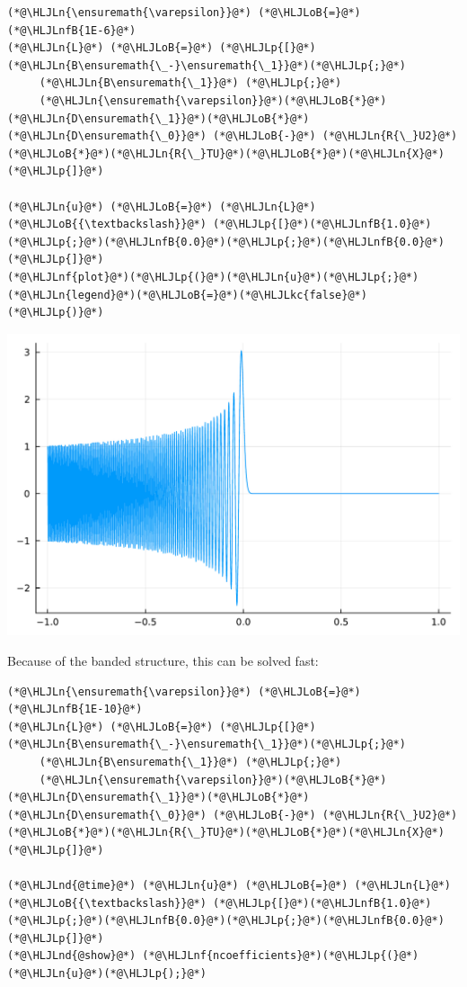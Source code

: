 \documentclass[12pt,a4paper]{article}
\newcommand{\HLJLkc}[1]{\textcolor[RGB]{59,151,46}{\textit{#1}}}
\newcommand{\HLJLn}[1]{#1}
\newcommand{\HLJLnd}[1]{\textcolor[RGB]{214,102,97}{#1}}
\newcommand{\HLJLnf}[1]{\textcolor[RGB]{66,102,213}{#1}}
\newcommand{\HLJLnfB}[1]{\textcolor[RGB]{59,151,46}{#1}}
\newcommand{\HLJLoB}[1]{\textcolor[RGB]{102,102,102}{\textbf{#1}}}
\newcommand{\HLJLp}[1]{#1}
\begin{document}
\begin{lstlisting}
(*@\HLJLn{\ensuremath{\varepsilon}}@*) (*@\HLJLoB{=}@*) (*@\HLJLnfB{1E-6}@*)
(*@\HLJLn{L}@*) (*@\HLJLoB{=}@*) (*@\HLJLp{[}@*)(*@\HLJLn{B\ensuremath{\_-}\ensuremath{\_1}}@*)(*@\HLJLp{;}@*)
     (*@\HLJLn{B\ensuremath{\_1}}@*) (*@\HLJLp{;}@*)
     (*@\HLJLn{\ensuremath{\varepsilon}}@*)(*@\HLJLoB{*}@*)(*@\HLJLn{D\ensuremath{\_1}}@*)(*@\HLJLoB{*}@*)(*@\HLJLn{D\ensuremath{\_0}}@*) (*@\HLJLoB{-}@*) (*@\HLJLn{R{\_}U2}@*)(*@\HLJLoB{*}@*)(*@\HLJLn{R{\_}TU}@*)(*@\HLJLoB{*}@*)(*@\HLJLn{X}@*)(*@\HLJLp{]}@*)

(*@\HLJLn{u}@*) (*@\HLJLoB{=}@*) (*@\HLJLn{L}@*) (*@\HLJLoB{{\textbackslash}}@*) (*@\HLJLp{[}@*)(*@\HLJLnfB{1.0}@*)(*@\HLJLp{;}@*)(*@\HLJLnfB{0.0}@*)(*@\HLJLp{;}@*)(*@\HLJLnfB{0.0}@*)(*@\HLJLp{]}@*)
(*@\HLJLnf{plot}@*)(*@\HLJLp{(}@*)(*@\HLJLn{u}@*)(*@\HLJLp{;}@*) (*@\HLJLn{legend}@*)(*@\HLJLoB{=}@*)(*@\HLJLkc{false}@*)(*@\HLJLp{)}@*)
\end{lstlisting}

\includegraphics[width=\linewidth]{jl_hpkPoK/OP_methods_test_44_1.pdf}

Because of the banded structure, this can be solved fast:


\begin{lstlisting}
(*@\HLJLn{\ensuremath{\varepsilon}}@*) (*@\HLJLoB{=}@*) (*@\HLJLnfB{1E-10}@*)
(*@\HLJLn{L}@*) (*@\HLJLoB{=}@*) (*@\HLJLp{[}@*)(*@\HLJLn{B\ensuremath{\_-}\ensuremath{\_1}}@*)(*@\HLJLp{;}@*)
     (*@\HLJLn{B\ensuremath{\_1}}@*) (*@\HLJLp{;}@*)
     (*@\HLJLn{\ensuremath{\varepsilon}}@*)(*@\HLJLoB{*}@*)(*@\HLJLn{D\ensuremath{\_1}}@*)(*@\HLJLoB{*}@*)(*@\HLJLn{D\ensuremath{\_0}}@*) (*@\HLJLoB{-}@*) (*@\HLJLn{R{\_}U2}@*)(*@\HLJLoB{*}@*)(*@\HLJLn{R{\_}TU}@*)(*@\HLJLoB{*}@*)(*@\HLJLn{X}@*)(*@\HLJLp{]}@*)

(*@\HLJLnd{@time}@*) (*@\HLJLn{u}@*) (*@\HLJLoB{=}@*) (*@\HLJLn{L}@*) (*@\HLJLoB{{\textbackslash}}@*) (*@\HLJLp{[}@*)(*@\HLJLnfB{1.0}@*)(*@\HLJLp{;}@*)(*@\HLJLnfB{0.0}@*)(*@\HLJLp{;}@*)(*@\HLJLnfB{0.0}@*)(*@\HLJLp{]}@*)
(*@\HLJLnd{@show}@*) (*@\HLJLnf{ncoefficients}@*)(*@\HLJLp{(}@*)(*@\HLJLn{u}@*)(*@\HLJLp{);}@*)
\end{lstlisting}
\end{document}
